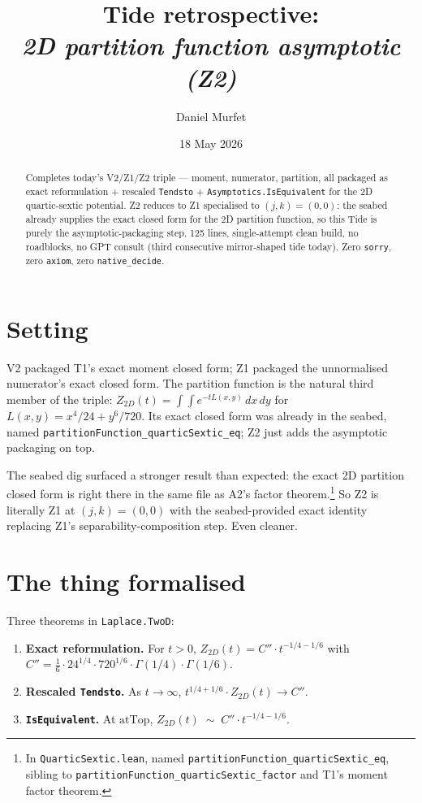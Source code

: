 \documentclass[11pt]{article}
\title{Tide retrospective:\\\emph{2D partition function asymptotic (Z2)}}
\author{Daniel Murfet}
\date{18 May 2026}
\begin{document}
\maketitle

\begin{abstract}
Completes today's V2/Z1/Z2 triple --- moment, numerator, partition,
all packaged as exact reformulation + rescaled \texttt{Tendsto} +
\texttt{Asymptotics.IsEquivalent} for the 2D quartic-sextic potential.
Z2 reduces to Z1 specialised to $(j, k) = (0, 0)$: the seabed already
supplies the exact closed form for the 2D partition function, so
this Tide is purely the asymptotic-packaging step. 125 lines,
single-attempt clean build, no roadblocks, no GPT consult (third
consecutive mirror-shaped tide today). Zero \texttt{sorry}, zero
\texttt{axiom}, zero \texttt{native\_decide}.
\end{abstract}

\section{Setting}

V2 packaged T1's exact moment closed form; Z1 packaged the
unnormalised numerator's exact closed form. The partition function
is the natural third member of the triple: $Z_{2D}(t) =
\int\!\int e^{-tL(x, y)}\,dx\,dy$ for $L(x, y) = x^4/24 + y^6/720$.
Its exact closed form was already in the seabed, named
\texttt{partitionFunction\_quarticSextic\_eq}; Z2 just adds the
asymptotic packaging on top.

The seabed dig surfaced a stronger result than expected: the exact
2D partition closed form is right there in the same file as A2's
factor theorem.\footnote{In \texttt{QuarticSextic.lean}, named
\texttt{partitionFunction\_quarticSextic\_eq}, sibling to
\texttt{partitionFunction\_quarticSextic\_factor} and T1's moment
factor theorem.} So Z2 is literally Z1 at $(j, k) = (0, 0)$ with the
seabed-provided exact identity replacing Z1's
separability-composition step. Even cleaner.

\section{The thing formalised}

Three theorems in \texttt{Laplace.TwoD}:

\begin{enumerate}[leftmargin=1.5em]
\item \textbf{Exact reformulation.} For $t > 0$,
  $Z_{2D}(t) = C''\cdot t^{-1/4 - 1/6}$ with
  $C'' = \tfrac{1}{6} \cdot 24^{1/4} \cdot 720^{1/6}
  \cdot \Gamma(1/4)\cdot \Gamma(1/6)$.
\item \textbf{Rescaled \texttt{Tendsto}.} As $t \to \infty$,
  $t^{1/4 + 1/6}\cdot Z_{2D}(t) \to C''$.
\item \textbf{\texttt{IsEquivalent}.} At $\mathrm{atTop}$,
  $Z_{2D}(t) \;\sim\; C''\cdot t^{-1/4 - 1/6}$.
\end{enumerate}
\end{document}
